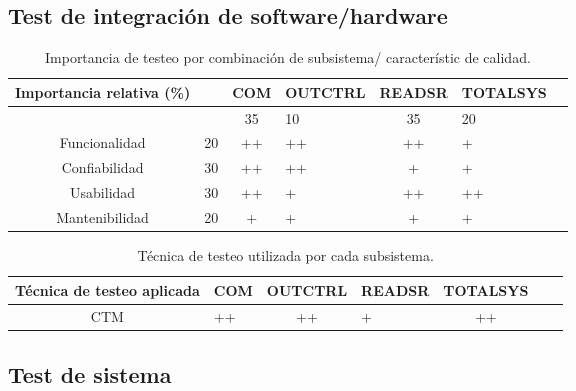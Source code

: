 \documentclass[12pt]{article}
\begin{document}
\subsection{Test de integración de software/hardware}
\begin{table}[ht]
    \centering
    \begin{tabularx}{\linewidth}{@{}|c|X|c|X|c|X|c|@{}}\hline \hline
    \rowcolor[HTML]{d6c6c3}
 Importancia relativa (\%)& &  COM & OUTCTRL & READSR & TOTALSYS\\
        \hline
       
         &  &35 & 10 &35 & 20                          \\
        Funcionalidad    & 20 & ++ & ++ & ++ & +		\\
        Confiabilidad    & 30 & ++ & ++ & +& +                        \\
        Usabilidad       & 30 & ++ & + & ++ & ++                        \\
        Mantenibilidad   & 20 & + & + & + & +                        \\
        \hline
    \end{tabularx}
    \caption{Importancia de testeo por combinación de subsistema/ característic de calidad.}
\end{table}


\begin{table}[ht]
    \centering
    \begin{tabularx}{\linewidth}{@{}|c|X|c|X|c|X|c|@{}}\hline \hline
    \rowcolor[HTML]{d6c6c3}
 Técnica de testeo aplicada & COM & OUTCTRL & READSR & TOTALSYS\\
        \hline
       CTM & ++ & ++ & + & ++ \\
        \hline
    \end{tabularx}
    \caption{Técnica de testeo utilizada por cada subsistema.}
\end{table}


\subsection{Test de sistema}
\end{document}
